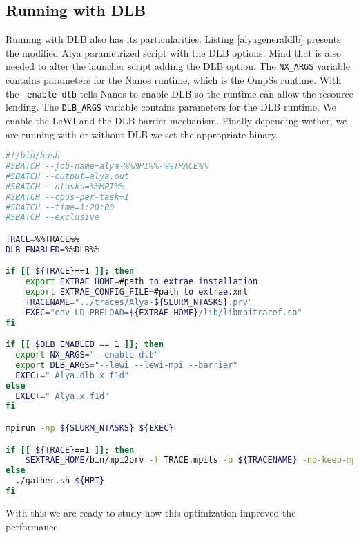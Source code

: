 \subsection{Running with DLB}

Running with DLB also has its particularities.  Listing \ref{alyageneraldlb} presents the modified Alya parametrized script with the DLB options. Mind that is also needed to alter the launcher script adding the DLB option. The \texttt{NX\_ARGS} variable contains parameters for the Nanos runtime, which is the OmpSs runtime.  With the \texttt{--enable-dlb} tells Nanos to enable DLB so the runtime can allow the resource lending.  The \texttt{DLB\_ARGS} variable contains parameters for the DLB runtime. We enable the LeWI and the DLB barrier mechanism. Finally depending wether, we are running with or without DLB  we set the appropriate binary. 

\begin{lstlisting}[language=sh, caption={Parametrized alya script with DLB.}, label={alyageneraldlb}]
#!/bin/bash
#SBATCH --job-name=alya-%%MPI%%-%%TRACE%%
#SBATCH --output=alya.out
#SBATCH --ntasks=%%MPI%%
#SBATCH --cpus-per-task=1
#SBATCH --time=1:20:00
#SBATCH --exclusive

TRACE=%%TRACE%%
DLB_ENABLED=%%DLB%%

if [[ ${TRACE}==1 ]]; then 
    export EXTRAE_HOME=#path to extrae installation
    export EXTRAE_CONFIG_FILE=#path to extrae.xml
    TRACENAME="../traces/Alya-${SLURM_NTASKS}.prv"
    EXEC="env LD_PRELOAD=${EXTRAE_HOME}/lib/libmpitracef.so"
fi

if [[ $DLB_ENABLED == 1 ]]; then
  export NX_ARGS="--enable-dlb"
  export DLB_ARGS="--lewi --lewi-mpi --barrier"
  EXEC+=" Alya.dlb.x f1d"
else
  EXEC+=" Alya.x f1d"
fi

mpirun -np ${SLURM_NTASKS} ${EXEC}

if [[ ${TRACE}==1 ]]; then
    $EXTRAE_HOME/bin/mpi2prv -f TRACE.mpits -o ${TRACENAME} -no-keep-mpits
else
  ./gather.sh ${MPI}
fi
\end{lstlisting}

With this we are ready to study how this optimization improved the performance.
